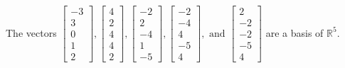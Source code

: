 \begin{exercise}
\begin{exerciseStatement}
  \end{exerciseStatement}
  \begin{exerciseAnswer}
   The vectors \(\left[\begin{array}{r}
-3 \\
3 \\
0 \\
1 \\
2
\end{array}\right] , \left[\begin{array}{r}
4 \\
2 \\
4 \\
4 \\
2
\end{array}\right] , \left[\begin{array}{r}
-2 \\
2 \\
-4 \\
1 \\
-5
\end{array}\right] , \left[\begin{array}{r}
-2 \\
-4 \\
4 \\
-5 \\
4
\end{array}\right] , \text{ and } \left[\begin{array}{r}
2 \\
-2 \\
-2 \\
-5 \\
4
\end{array}\right]\) 
  	 are  a basis of \(\mathbb{R}^5\).
  


  \end{exerciseAnswer}
\end{exercise}